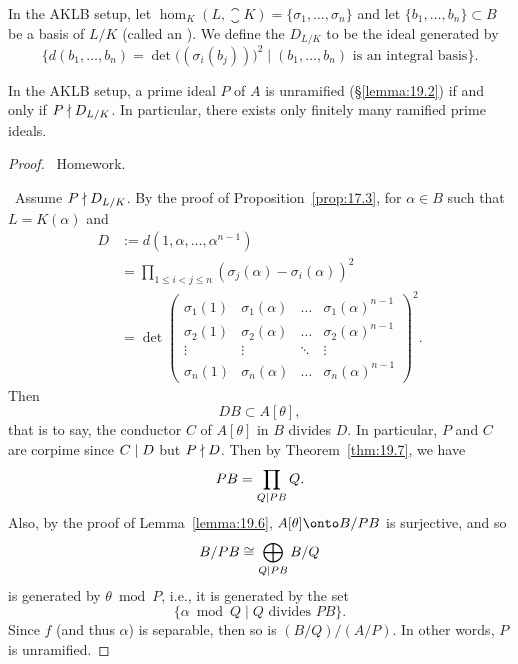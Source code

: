 \begin{definition}
In the AKLB setup, let $\hom_{K}(L,\closure{K})=\{\sigma_{1},\dots,\sigma_{n}\}$
and let $\{b_{1},\dots,b_{n}\}\subset B$ be a basis of $L/K$ (called
an ). We define the 
$D_{L/K}$ to be the ideal generated by
\begin{equation}
\{d(b_{1},\dots,b_{n})=\det\bigl((\sigma_{i}(b_{j}))\bigr)^{2}\mid
(b_{1},\dots,b_{n})\mbox{ is an integral basis}\}.
\end{equation}
\end{definition}

\begin{theorem}\label{thm:19.8}
In the AKLB setup, a prime ideal $P$ of $A$ is unramified (\S\ref{lemma:19.2})
if and only if $P\nmid D_{L/K}$. In particular, there exists only
finitely many ramified prime ideals.
\end{theorem}

\begin{proof}
\forwardproof\ Homework.

\backwardproof\ Assume $P\nmid D_{L/K}$. By the proof of
Proposition~\ref{prop:17.3}, for $\alpha\in B$ such that $L=K(\alpha)$
and
\begin{subequations}
  \begin{align}
D & := d(1,\alpha,\dots,\alpha^{n-1})\\
&=\prod_{1\leq i<j\leq n}(\sigma_{j}(\alpha)-\sigma_{i}(\alpha))^{2}\\
&=\det\begin{pmatrix}
\sigma_{1}(1) & \sigma_{1}(\alpha) & \dots & \sigma_{1}(\alpha)^{n-1}\\
\sigma_{2}(1) & \sigma_{2}(\alpha) & \dots & \sigma_{2}(\alpha)^{n-1}\\
\vdots & \vdots & \ddots & \vdots\\
\sigma_{n}(1) & \sigma_{n}(\alpha) & \dots & \sigma_{n}(\alpha)^{n-1}
\end{pmatrix}^{2}.
  \end{align}
\end{subequations}
Then
\begin{equation}
DB\subset A[\theta],
\end{equation}
that is to say, the conductor $C$ of $A[\theta]$ in $B$ divides
$D$. In particular, $P$ and $C$ are corpime since $C\mid D$ but
$P\nmid D$. Then by Theorem~\ref{thm:19.7}, we have
\begin{equation}
PB=\prod_{Q\mid PB}Q.
\end{equation}
Also, by the proof of Lemma~\ref{lemma:19.6}, $A[\theta]\onto B/PB$ is
surjective, and so
\begin{equation}
B/PB\cong\bigoplus_{Q\mid PB}B/Q
\end{equation}
is generated by $\theta\bmod{P}$, i.e., it is generated by the set
\begin{equation}
\{\alpha\bmod{Q}\mid Q\mbox{ divides }PB\}.
\end{equation}
Since $f$ (and thus $\alpha$) is separable, then so is $(B/Q)/(A/P)$.
In other words, $P$ is unramified.
\end{proof}